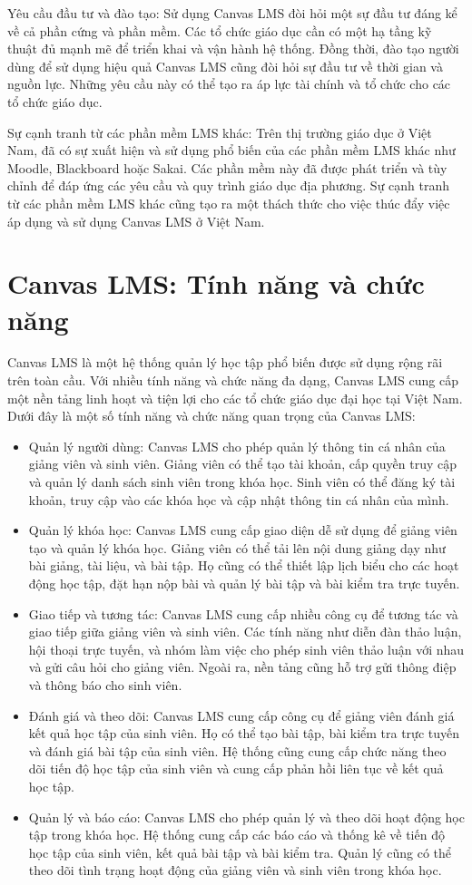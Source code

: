 \documentclass[../Thesis.tex]{subfiles}
\begin{document}
		Yêu cầu đầu tư và đào tạo: Sử dụng Canvas LMS đòi hỏi một sự đầu tư đáng kể về cả phần cứng và phần mềm. Các tổ chức giáo dục cần có một hạ tầng kỹ thuật đủ mạnh mẽ để triển khai và vận hành hệ thống. Đồng thời, đào tạo người dùng để sử dụng hiệu quả Canvas LMS cũng đòi hỏi sự đầu tư về thời gian và nguồn lực. Những yêu cầu này có thể tạo ra áp lực tài chính và tổ chức cho các tổ chức giáo dục.

		Sự cạnh tranh từ các phần mềm LMS khác: Trên thị trường giáo dục ở Việt Nam, đã có sự xuất hiện và sử dụng phổ biến của các phần mềm LMS khác như Moodle, Blackboard hoặc Sakai. Các phần mềm này đã được phát triển và tùy chỉnh để đáp ứng các yêu cầu và quy trình giáo dục địa phương. Sự cạnh tranh từ các phần mềm LMS khác cũng tạo ra một thách thức cho việc thúc đẩy việc áp dụng và sử dụng Canvas LMS ở Việt Nam.
\section{Canvas LMS: Tính năng và chức năng}
Canvas LMS là một hệ thống quản lý học tập phổ biến được sử dụng rộng rãi trên toàn cầu. Với nhiều tính năng và chức năng đa dạng, Canvas LMS cung cấp một nền tảng linh hoạt và tiện lợi cho các tổ chức giáo dục đại học tại Việt Nam. Dưới đây là một số tính năng và chức năng quan trọng của Canvas LMS:

\begin{itemize}[label=$\bullet$]
	\item Quản lý người dùng: Canvas LMS cho phép quản lý thông tin cá nhân của giảng viên và sinh viên. Giảng viên có thể tạo tài khoản, cấp quyền truy cập và quản lý danh sách sinh viên trong khóa học. Sinh viên có thể đăng ký tài khoản, truy cập vào các khóa học và cập nhật thông tin cá nhân của mình.
	\item Quản lý khóa học: Canvas LMS cung cấp giao diện dễ sử dụng để giảng viên tạo và quản lý khóa học. Giảng viên có thể tải lên nội dung giảng dạy như bài giảng, tài liệu, và bài tập. Họ cũng có thể thiết lập lịch biểu cho các hoạt động học tập, đặt hạn nộp bài và quản lý bài tập và bài kiểm tra trực tuyến.
	\item Giao tiếp và tương tác: Canvas LMS cung cấp nhiều công cụ để tương tác và giao tiếp giữa giảng viên và sinh viên. Các tính năng như diễn đàn thảo luận, hội thoại trực tuyến, và nhóm làm việc cho phép sinh viên thảo luận với nhau và gửi câu hỏi cho giảng viên. Ngoài ra, nền tảng cũng hỗ trợ gửi thông điệp và thông báo cho sinh viên.
	\item Đánh giá và theo dõi: Canvas LMS cung cấp công cụ để giảng viên đánh giá kết quả học tập của sinh viên. Họ có thể tạo bài tập, bài kiểm tra trực tuyến và đánh giá bài tập của sinh viên. Hệ thống cũng cung cấp chức năng theo dõi tiến độ học tập của sinh viên và cung cấp phản hồi liên tục về kết quả học tập.
	\item Quản lý và báo cáo: Canvas LMS cho phép quản lý và theo dõi hoạt động học tập trong khóa học. Hệ thống cung cấp các báo cáo và thống kê về tiến độ học tập của sinh viên, kết quả bài tập và bài kiểm tra. Quản lý cũng có thể theo dõi tình trạng hoạt động của giảng viên và sinh viên trong khóa học.
\end{itemize}
\end{document}
